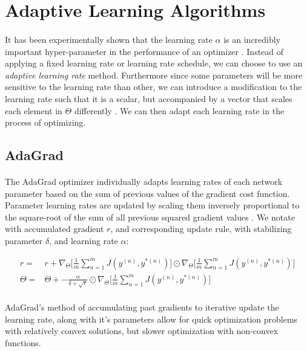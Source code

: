 \documentclass[12pt,letterpaper]{article}
\begin{document}
\section{Adaptive Learning Algorithms}

\paragraph*{}It has been experimentally shown that the learning rate $\alpha$ is an incredibly important hyper-parameter in the performance of an optimizer \cite{Geron}. Instead of applying a fixed learning rate or learning rate schedule, we can choose to use an \textit{adaptive learning rate} method. Furthermore since some parameters will be more sensitive to the learning rate than other, we can introduce a modification to the learning rate such that it is a scalar, but accompanied by a vector that scales each element in $\Theta$ differently \cite{Goodfellow}. We can then adapt each learning rate in the process of optimizing.

\subsection{AdaGrad}

\paragraph*{}The AdaGrad optimizer individually adapts learning rates of each network parameter based on the sum of previous values of the gradient cost function. Parameter learning rates are updated by scaling them inversely proportional to the square-root of the sum of all previous squared gradient values \cite{Goodfellow}. We notate with accumulated gradient $r$,  and corresponding update rule, with stabilizing parameter $\delta$, and learning rate $\alpha$:

\begin{equation}
\label{AdaGrad update}
\begin{split}
r =& r + \nabla_{\Theta} \Big[ \frac{1}{m} \sum_{n=1}^{m} J(y^{(n)},y^{*(n)}) \Big] 
\odot \nabla_{\Theta} \Big[ \frac{1}{m} \sum_{n=1}^{m} J(y^{(n)},y^{*(n)}) \Big] \\
\Theta =& \Theta + -\frac{\alpha}{\delta + \sqrt{r}} \odot \nabla_{\Theta} \Big[ \frac{1}{m} \sum_{n=1}^{m} J(y^{(n)},y^{*(n)}) \Big] 
\end{split}
\end{equation}

\paragraph*{}AdaGrad's method of accumulating past gradients to iterative update the learning rate, along with it's parameters allow for quick optimization problems with relatively convex solutions, but slower optimization with non-convex functions.
\end{document}
